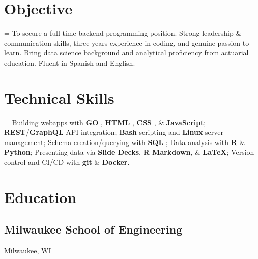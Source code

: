 \documentclass[12pt]{article}
\newcommand{\itemspace}[0]{
  \vspace{0.3170em}
}
\renewcommand{\textsc}[1]{%
  \uppercase{\footnotesize#1}\normalsize
}
\begin{document}
\maketitle

\itemspace

\vfill
\section{Objective}

\hangindent=\parindent %
To secure a full-time backend programming position.
Strong leadership \& communication skills, three years experience in coding,
and genuine passion to learn. Bring data science background and analytical
proficiency from actuarial education. Fluent in Spanish and English.

\itemspace

\section{Technical Skills}

\hangindent=\parindent %
Building webapps with \textbf{\textsc{go}}, \textbf{\textsc{html}}, \textbf{\textsc{css}},
  \& \textbf{JavaScript};
\textbf{REST}/\textbf{GraphQL} API integration;
\textbf{Bash} scripting and \textbf{Linux} server management;
Schema creation/querying with \textbf{\textsc{sql}};
Data analysis with \textbf{\textsc{r}} \& \textbf{Python};
Presenting data via \textbf{Slide Decks}, \textbf{R Markdown},
  \& \textbf{\LaTeX{}};
Version control and CI/CD with \textbf{git} \& \textbf{Docker}.

\itemspace

\section{Education}

\subsection{Milwaukee School of Engineering} \hfill Milwaukee, WI
\end{document}
